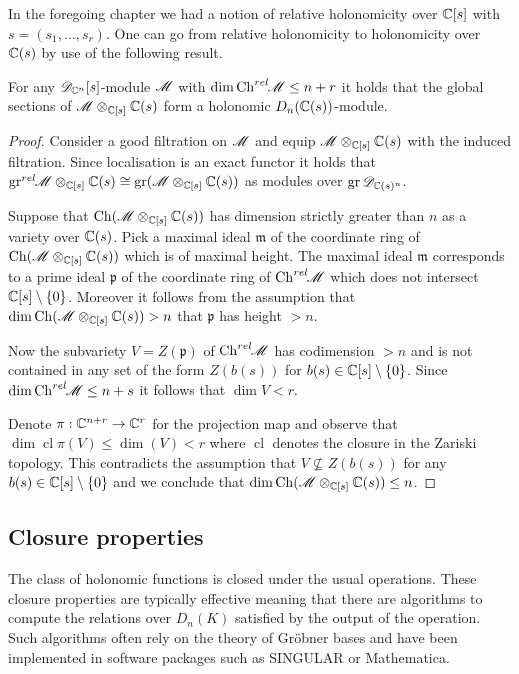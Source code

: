 In the foregoing chapter we had a notion of relative holonomicity over $\mathbb{C}[s]$ with $s = (s_1,\ldots,s_r)$.
One can go from relative holonomicity to holonomicity over $\mathbb{C}(s)$ by use of the following result.
\begin{lemma}
    For any $\mathscr{D}_{\mathbb{C}^n}[s]$-module $\mathscr{M}$ with $\dim\operatorname{Ch}^{rel}\mkern-5mu\mathscr{M}\leq n+r$ it holds that the global sections of $\mathscr{M}\otimes_{\mathbb{C}[s]}\mathbb{C}(s)$ form a holonomic $D_n(\mathbb{C}(s))$-module.
\end{lemma}
  \begin{proof}
    Consider a good filtration on $\mathscr{M}$ and equip $\mathscr{M}\otimes_{\mathbb{C}[s]}\mathbb{C}(s)$ with the induced filtration.
    Since localisation is an exact functor it holds that $\operatorname{gr}^{rel}\mkern-5mu\mathscr{M}\otimes_{\mathbb{C}[s]}\mathbb{C}(s) \cong \operatorname{gr}(\mathscr{M}\otimes_{\mathbb{C}[s]}\mathbb{C}(s)) $ as modules over $\operatorname{gr}\mathscr{D}_{\mathbb{C}(s)^n}$.

    Suppose that $\operatorname{Ch}(\mathscr{M}\otimes_{\mathbb{C}[s]}\mathbb{C}(s))$ has dimension strictly greater than $n$ as a variety over $\mathbb{C}(s)$.
    Pick a maximal ideal $\mathfrak{m}$ of the coordinate ring of $\operatorname{Ch} (\mathscr{M}\otimes_{\mathbb{C}[s]}\mathbb{C}(s))$ which is of maximal height.
    The maximal ideal $\mathfrak{m}$ corresponds to a prime ideal $\mathfrak{p}$ of the coordinate ring of $\operatorname{Ch}^{rel}\mkern-5mu\mathscr{M}$ which does not intersect $\mathbb{C}[s]\setminus\{0\}$.
    Moreover it follows from the assumption that  $\dim\operatorname{Ch}(\mathscr{M}\otimes_{\mathbb{C}[s]}\mathbb{C}(s))> n$ that $\mathfrak{p}$ has height $>n$.

    Now the subvariety $V = Z(\mathfrak{p})$ of $\operatorname{Ch}^{rel}\mkern-5mu\mathscr{M}$ has codimension $>n$ and is not contained in any set of the form $Z(b(s))$ for $b(s)\in \mathbb{C}[s]\setminus\{0\}$.
    Since $\dim\operatorname{Ch}^{rel}\mkern-5mu\mathscr{M}\leq n+s$ it follows that $\dim V <r$.

    Denote $\pi:\mathbb{C}^{n+r}\to\mathbb{C}^r $ for the projection map and observe that $\dim\operatorname{cl}\pi(V)\leq \dim(V) < r$ where $\operatorname{cl}$ denotes the closure in the Zariski topology. %
    This contradicts the assumption that $V\nsubseteq Z(b(s))$ for any $b(s)\in \mathbb{C}[s]\setminus\{0\}$ and we conclude that $\dim \operatorname{Ch} (\mathscr{M}\otimes_{\mathbb{C}[s]}\mathbb{C}(s)) \leq n$.
    \end{proof}
    \subsection{Closure properties}
    The class of holonomic functions is closed under the usual operations.
    These closure properties are typically effective meaning that there are algorithms to compute the relations over $D_n(K)$ satisfied by the output of the operation.
    Such algorithms often rely on the theory of Gr\"obner bases and have been implemented in software packages such as SINGULAR or Mathematica.

